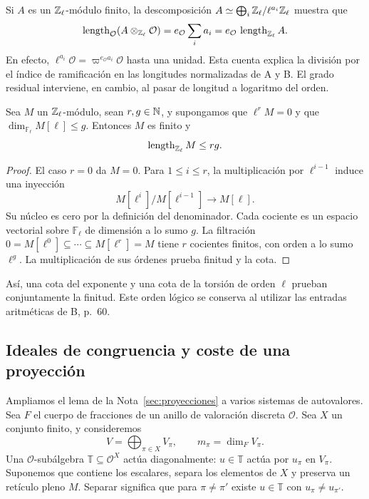 Si $A$ es un $\mathbb{Z}_\ell$-módulo finito, la descomposición
$A\simeq\bigoplus_i\mathbb{Z}_\ell/\ell^{a_i}\mathbb{Z}_\ell$ muestra que
\begin{equation}
 \operatorname{length}_{\mathcal O}(A\otimes_{\mathbb{Z}_\ell}\mathcal O)
 =e_{\mathcal O}\sum_i a_i
 =e_{\mathcal O}\,\operatorname{length}_{\mathbb{Z}_\ell}A.
 \label{eq:cohom-base-cambio}
\end{equation}
En efecto, $\ell^{a_i}\mathcal O=\varpi^{e_{\mathcal O}a_i}
\mathcal O$ hasta una unidad. Esta cuenta explica la
división por el índice de ramificación en las longitudes
normalizadas de A y B. El grado residual interviene,
en cambio, al pasar de longitud a logaritmo del orden.

\begin{lema}
\label{lem:cohom-exponente}
Sea $M$ un $\mathbb{Z}_\ell$-módulo, sean $r,g\in\mathbb{N}$, y supongamos
que $\ell^rM=0$ y que
$\dim_{\mathbb F_\ell}M[\ell]\le g$.
Entonces $M$ es finito y
\[
 \operatorname{length}_{\mathbb{Z}_\ell}M\le rg.
\]
\end{lema}

\begin{proof}
El caso $r=0$ da $M=0$. Para $1\le i\le r$,
la multiplicación por $\ell^{i-1}$ induce una inyección
\[
 M[\ell^i]/M[\ell^{i-1}]\longrightarrow M[\ell].
\]
Su núcleo es cero por la definición del denominador.
Cada cociente es un espacio vectorial sobre $\mathbb F_\ell$
de dimensión a lo sumo $g$. La filtración
$0=M[\ell^0]\subseteq\cdots\subseteq M[\ell^r]=M$
tiene $r$ cocientes finitos, con orden a lo sumo $\ell^g$.
La multiplicación de sus órdenes prueba finitud y la cota.
\end{proof}

Así, una cota del exponente y una cota de la torsión
de orden $\ell$ prueban conjuntamente la finitud.
Este orden lógico se conserva al utilizar las entradas
aritméticas de B, p.~60.

\subsection{Ideales de congruencia y coste de una proyección}

Ampliamos el lema de la Nota~\ref{sec:proyecciones} a varios
sistemas de autovalores. Sea $F$ el cuerpo de fracciones
de un anillo de valoración discreta $\mathcal O$.
Sea $X$ un conjunto finito, y consideremos
\[
 V=\bigoplus_{\pi\in X}V_\pi,\qquad
 m_\pi=\dim_FV_\pi.
\]
Una $\mathcal O$-subálgebra $\mathbb T\subseteq\mathcal O^X$
actúa diagonalmente: $u\in\mathbb T$ actúa por $u_\pi$
en $V_\pi$. Suponemos que contiene los escalares,
separa los elementos de $X$ y preserva un retículo pleno $M$.
Separar significa que para $\pi\ne\pi'$ existe $u\in\mathbb T$
con $u_\pi\ne u_{\pi'}$.

